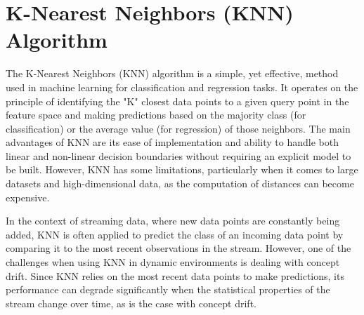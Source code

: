 \section{K-Nearest Neighbors (KNN) Algorithm}
\label{sec:knn}
The K-Nearest Neighbors \cite{zhang2022knnens} (KNN) algorithm is a simple, yet effective, method used in machine learning for classification and regression tasks. It operates on the principle of identifying the "K" closest data points to a given query point in the feature space and making predictions based on the majority class (for classification) or the average value (for regression) of those neighbors. The main advantages of KNN are its ease of implementation and ability to handle both linear and non-linear decision boundaries without requiring an explicit model to be built. However, KNN has some limitations, particularly when it comes to large datasets and high-dimensional data, as the computation of distances can become expensive.

In the context of streaming data, where new data points are constantly being added, KNN is often applied to predict the class of an incoming data point by comparing it to the most recent observations in the stream. However, one of the challenges when using KNN in dynamic environments is dealing with concept drift. Since KNN relies on the most recent data points to make predictions, its performance can degrade significantly when the statistical properties of the stream change over time, as is the case with concept drift.